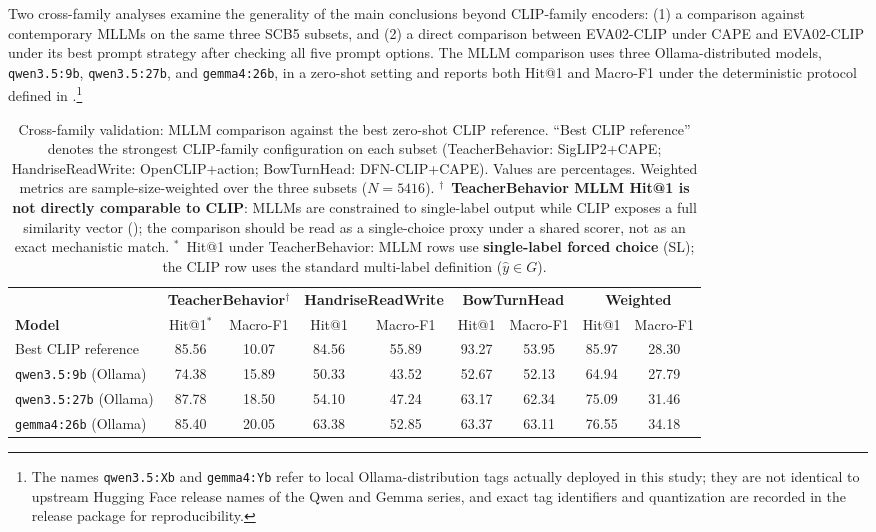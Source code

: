 \documentclass[electronics,article,submit,pdftex,moreauthors]{Definitions/mdpi}
\begin{document}
Two cross-family analyses examine the generality of the main conclusions beyond CLIP-family encoders: (1) a comparison against contemporary MLLMs on the same three SCB5 subsets, and (2) a direct comparison between EVA02-CLIP under CAPE and EVA02-CLIP under its best prompt strategy after checking all five prompt options. The MLLM comparison uses three Ollama-distributed models, \texttt{qwen3.5:9b}, \texttt{qwen3.5:27b}, and \texttt{gemma4:26b}, in a zero-shot setting and reports both Hit@1 and Macro-F1 under the deterministic protocol defined in .\footnote{The names \texttt{qwen3.5:Xb} and \texttt{gemma4:Yb} refer to local Ollama-distribution tags actually deployed in this study; they are not identical to upstream Hugging Face release names of the Qwen and Gemma series, and exact tag identifiers and quantization are recorded in the release package for reproducibility.}

\begin{table}[H]
\caption{Cross-family validation: MLLM comparison against the best zero-shot CLIP reference. ``Best CLIP reference'' denotes the strongest CLIP-family configuration on each subset (TeacherBehavior: SigLIP2+CAPE; HandriseReadWrite: OpenCLIP+action; BowTurnHead: DFN-CLIP+CAPE). Values are percentages. Weighted metrics are sample-size-weighted over the three subsets ($N=5416$). $^{\dagger}$~\textbf{TeacherBehavior MLLM Hit@1 is not directly comparable to CLIP}: MLLMs are constrained to single-label output while CLIP exposes a full similarity vector (); the comparison should be read as a single-choice proxy under a shared scorer, not as an exact mechanistic match. $^{*}$~Hit@1 under TeacherBehavior: MLLM rows use \textbf{single-label forced choice} (SL); the CLIP row uses the standard multi-label definition ($\hat{y}\in G$).}
\label{tab:mllm_validation}
\centering
\small
\setlength{\tabcolsep}{3pt}
\begin{tabular}{l cc cc cc cc}
\toprule
 & \multicolumn{2}{c}{\textbf{TeacherBehavior}$^{\dagger}$} & \multicolumn{2}{c}{\textbf{HandriseReadWrite}} & \multicolumn{2}{c}{\textbf{BowTurnHead}} & \multicolumn{2}{c}{\textbf{Weighted}} \\
\cmidrule(lr){2-3}\cmidrule(lr){4-5}\cmidrule(lr){6-7}\cmidrule(lr){8-9}
\textbf{Model} & Hit@1$^{*}$ & Macro-F1 & Hit@1 & Macro-F1 & Hit@1 & Macro-F1 & Hit@1 & Macro-F1 \\
\midrule
Best CLIP reference & 85.56 & 10.07 & 84.56 & 55.89 & 93.27 & 53.95 & 85.97 & 28.30 \\
\texttt{qwen3.5:9b} (Ollama) & 74.38 & 15.89 & 50.33 & 43.52 & 52.67 & 52.13 & 64.94 & 27.79 \\
\texttt{qwen3.5:27b} (Ollama) & 87.78 & 18.50 & 54.10 & 47.24 & 63.17 & 62.34 & 75.09 & 31.46 \\
\texttt{gemma4:26b} (Ollama) & 85.40 & 20.05 & 63.38 & 52.85 & 63.37 & 63.11 & 76.55 & 34.18 \\
\bottomrule
\end{tabular}
\end{table}
\end{document}
